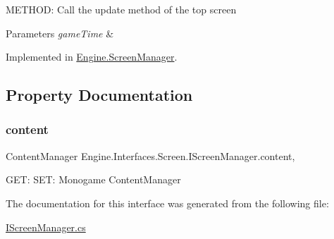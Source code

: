 M\+E\+T\+H\+OD\+: Call the update method of the top screen 


\begin{DoxyParams}{Parameters}
{\em game\+Time} & \\
\hline
\end{DoxyParams}


Implemented in \hyperlink{a00538_a59b04e135a3b2a75a608752e2bfabc77}{Engine.\+Screen\+Manager}.



\subsection{Property Documentation}
\mbox{\label{a00470_a6409574161f945f4b0bd089fcc7e1014}} 
\subsubsection{\texorpdfstring{content}{content}}
{\footnotesize\ttfamily Content\+Manager Engine.\+Interfaces.\+Screen.\+I\+Screen\+Manager.\+content\hspace{0.3cm}{\ttfamily [get]}, {\ttfamily [set]}}



G\+ET\+: S\+ET\+: Monogame Content\+Manager 



The documentation for this interface was generated from the following file\+:\begin{DoxyCompactItemize}
\item 
\hyperlink{a00134}{I\+Screen\+Manager.\+cs}\end{DoxyCompactItemize}
